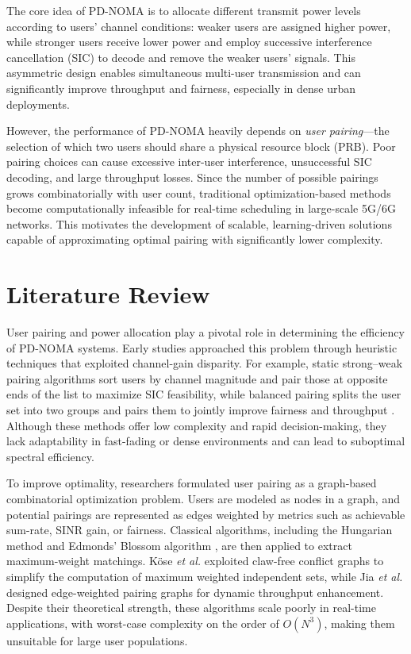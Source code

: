 \documentclass[conference]{IEEEtran}
\begin{document}
The core idea of PD-NOMA is to allocate different transmit power levels according to users’ channel conditions: weaker users are assigned higher power, while stronger users receive lower power and employ successive interference cancellation (SIC) to decode and remove the weaker users’ signals. This asymmetric design enables simultaneous multi-user transmission and can significantly improve throughput and fairness, especially in dense urban deployments.

However, the performance of PD-NOMA heavily depends on \emph{user pairing}—the selection of which two users should share a physical resource block (PRB). Poor pairing choices can cause excessive inter-user interference, unsuccessful SIC decoding, and large throughput losses. Since the number of possible pairings grows combinatorially with user count, traditional optimization-based methods become computationally infeasible for real-time scheduling in large-scale 5G/6G networks. This motivates the development of scalable, learning-driven solutions capable of approximating optimal pairing with significantly lower complexity.

\section{Literature Review}

User pairing and power allocation play a pivotal role in determining the efficiency of PD-NOMA systems. Early studies approached this problem through heuristic techniques that exploited channel-gain disparity. For example, static strong–weak pairing algorithms sort users by channel magnitude and pair those at opposite ends of the list to maximize SIC feasibility, while balanced pairing splits the user set into two groups and pairs them to jointly improve fairness and throughput \cite{su2017,islam2016}. Although these methods offer low complexity and rapid decision-making, they lack adaptability in fast-fading or dense environments and can lead to suboptimal spectral efficiency.

To improve optimality, researchers formulated user pairing as a graph-based combinatorial optimization problem. Users are modeled as nodes in a graph, and potential pairings are represented as edges weighted by metrics such as achievable sum-rate, SINR gain, or fairness. Classical algorithms, including the Hungarian method \cite{kuhn1955} and Edmonds’ Blossom algorithm \cite{edmonds1965}, are then applied to extract maximum-weight matchings. Köse \textit{et al.} \cite{kose2021graph} exploited claw-free conflict graphs to simplify the computation of maximum weighted independent sets, while Jia \textit{et al.} \cite{jia2018} designed edge-weighted pairing graphs for dynamic throughput enhancement. Despite their theoretical strength, these algorithms scale poorly in real-time applications, with worst-case complexity on the order of $O(N^{3})$, making them unsuitable for large user populations.
\end{document}
